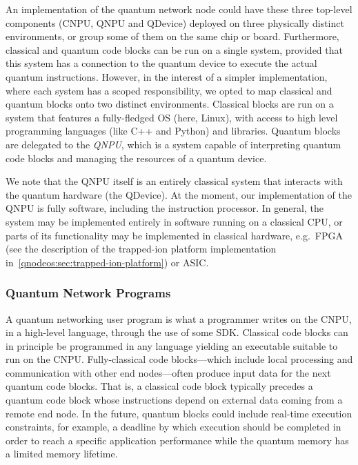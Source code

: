 An implementation of the quantum network node could have these three top-level components (\ac{CNPU}, \ac{QNPU} and \ac{QDevice}) deployed on three physically distinct environments, or group some of them on the same chip or board. Furthermore, classical and quantum code blocks can be run on a single system, provided that this system has a connection to the quantum device to execute the actual quantum instructions. However, in the interest of a simpler implementation, where each system has a scoped responsibility, we opted to map classical and quantum blocks onto two distinct environments. Classical blocks are run on a system that features a fully-fledged \ac{OS} (here, Linux), with access to high level programming languages (like C++ and Python) and libraries. Quantum blocks are delegated to the \emph{\ac{QNPU}}, which is a system capable of interpreting quantum code blocks and managing the resources of a quantum device. 

We note that the \ac{QNPU} itself is an entirely classical system that interacts with the quantum hardware (the \ac{QDevice}). At the moment, our implementation of the \ac{QNPU} is fully software, including the instruction processor. In general, the system may be implemented entirely in software running on a classical \ac{CPU}, or parts of its functionality may be implemented in classical hardware, e.g.~\ac{FPGA} (see the description of the trapped-ion platform implementation in~\cref{qnodeos:sec:trapped-ion-platform}) or \ac{ASIC}.

\subsubsection{Quantum Network Programs}
\label{qnodeos:sec:design:network-application}

A quantum networking user program is what a programmer writes on the \ac{CNPU}, in a high-level language, through the use of some \ac{SDK}. Classical code blocks can in principle be programmed in any language yielding an executable suitable to run on the \ac{CNPU}. Fully-classical code blocks---which include local processing and communication with other end nodes---often produce input data for the next quantum code blocks. That is, a classical code block typically precedes a quantum code block whose instructions depend on external data coming from a remote end node. In the future, quantum blocks could include real-time execution constraints, for example, a deadline by which execution should be completed in order to reach a specific application performance while the quantum memory has a limited memory lifetime.

